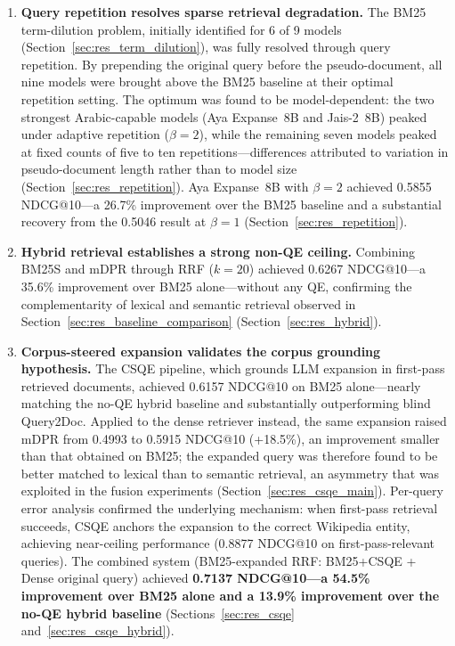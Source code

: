\begin{enumerate}[label=\roman*.]
    \item \textbf{Query repetition resolves sparse retrieval degradation.} The BM25 term-dilution problem, initially identified for 6 of 9 models (Section~\ref{sec:res_term_dilution}), was fully resolved through query repetition. By prepending the original query before the pseudo-document, all nine models were brought above the BM25 baseline at their optimal repetition setting. The optimum was found to be model-dependent: the two strongest Arabic-capable models (Aya Expanse~8B and Jais-2~8B) peaked under adaptive repetition ($\beta=2$), while the remaining seven models peaked at fixed counts of five to ten repetitions---differences attributed to variation in pseudo-document length rather than to model size (Section~\ref{sec:res_repetition}). Aya Expanse~8B with $\beta=2$ achieved 0.5855 NDCG@10---a 26.7\% improvement over the BM25 baseline and a substantial recovery from the 0.5046 result at $\beta=1$ (Section~\ref{sec:res_repetition}).
    \item \textbf{Hybrid retrieval establishes a strong non-QE ceiling.} Combining BM25S and mDPR through RRF ($k=20$) achieved 0.6267 NDCG@10---a 35.6\% improvement over BM25 alone---without any QE, confirming the complementarity of lexical and semantic retrieval observed in Section~\ref{sec:res_baseline_comparison} (Section~\ref{sec:res_hybrid}).
    \item \textbf{Corpus-steered expansion validates the corpus grounding hypothesis.} The CSQE pipeline, which grounds LLM expansion in first-pass retrieved documents, achieved 0.6157 NDCG@10 on BM25 alone---nearly matching the no-QE hybrid baseline and substantially outperforming blind Query2Doc. Applied to the dense retriever instead, the same expansion raised mDPR from 0.4993 to 0.5915 NDCG@10 (+18.5\%), an improvement smaller than that obtained on BM25; the expanded query was therefore found to be better matched to lexical than to semantic retrieval, an asymmetry that was exploited in the fusion experiments (Section~\ref{sec:res_csqe_main}). Per-query error analysis confirmed the underlying mechanism: when first-pass retrieval succeeds, CSQE anchors the expansion to the correct Wikipedia entity, achieving near-ceiling performance (0.8877 NDCG@10 on first-pass-relevant queries). The combined system (BM25-expanded RRF: BM25+CSQE + Dense original query) achieved \textbf{0.7137 NDCG@10---a 54.5\% improvement over BM25 alone and a 13.9\% improvement over the no-QE hybrid baseline} (Sections~\ref{sec:res_csqe} and~\ref{sec:res_csqe_hybrid}).

\end{enumerate}
